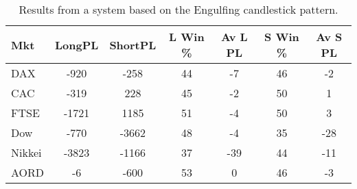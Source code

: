 \begin{table}[ht]
\centering
\caption[Results from a system based on the Engulfing candlestick pattern]{Results from a system based on the Engulfing candlestick pattern.} 
\label{tab:engulf_results}
\begin{tabular}{lcccccc}
  \toprule Mkt & LongPL & ShortPL & L Win \% & Av L PL & S Win \% & Av S PL \\ 
  \midrule DAX & -920 & -258 & 44 & -7 & 46 & -2 \\ 
  CAC & -319 & 228 & 45 & -2 & 50 & 1 \\ 
  FTSE & -1721 & 1185 & 51 & -4 & 50 & 3 \\ 
  Dow & -770 & -3662 & 48 & -4 & 35 & -28 \\ 
  Nikkei & -3823 & -1166 & 37 & -39 & 44 & -11 \\ 
  AORD & -6 & -600 & 53 & 0 & 46 & -3 \\ 
   \bottomrule \end{tabular}
\end{table}
